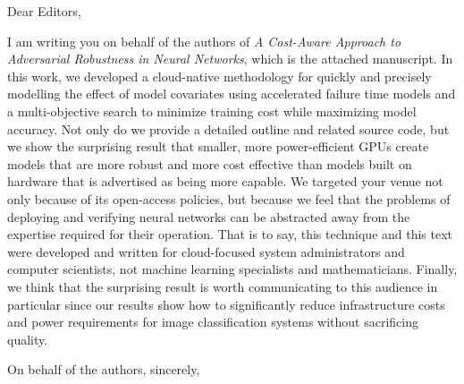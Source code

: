 \documentclass{letter}
\begin{document}
\begin{letter}{}
\opening{Dear Editors,}

I am writing you on behalf of the authors of \textit{A Cost-Aware Approach to Adversarial Robustness in Neural Networks}, which is the attached manuscript.  In this work, we developed a cloud-native methodology for quickly and precisely modelling the effect of model covariates using accelerated failure time models and a multi-objective search to minimize training cost while maximizing model accuracy. Not only do we provide a detailed outline and related source code, but we show the surprising result that smaller, more power-efficient GPUs create models that are more robust and more cost effective than models built on hardware that is advertised as being more capable. We targeted your venue not only because of its open-access policies, but because we feel that the problems of deploying and verifying neural networks can be abstracted away from the expertise required for their operation. That is to say, this technique and this text were developed and written for cloud-focused system administrators and computer scientists, not machine learning specialists and mathematicians. Finally, we think that the surprising result is worth communicating to this audience in particular since our results show how to significantly reduce infrastructure costs and power requirements for image classification systems without sacrificing quality.

\closing{On behalf of the authors, sincerely,}
\end{letter}
\end{document}
